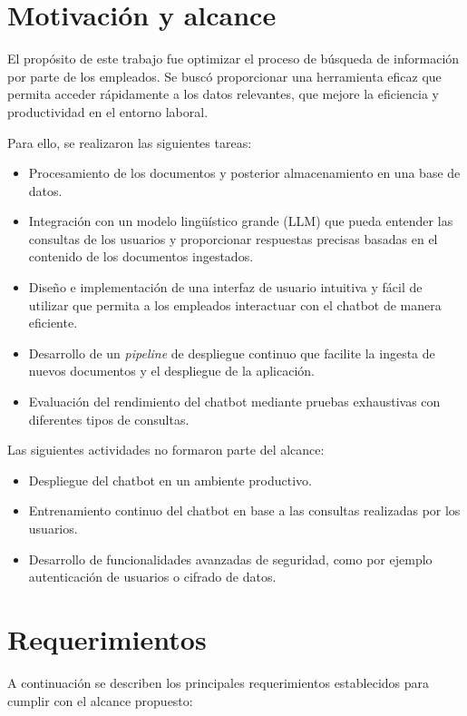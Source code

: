 \section{Motivación y alcance}

El propósito de este trabajo fue optimizar el proceso de búsqueda de información por parte de los empleados. Se buscó
proporcionar una herramienta eficaz que permita acceder rápidamente a los datos relevantes, que mejore la eficiencia y 
productividad en el entorno laboral.

Para ello, se realizaron las siguientes tareas:

\begin{itemize}
	\item Procesamiento de los documentos y posterior almacenamiento en una base de datos.
	\item Integración con un modelo lingüístico grande (LLM) que pueda entender las consultas de los usuarios y proporcionar respuestas precisas basadas en el contenido de los documentos ingestados.
	\item Diseño e implementación de una interfaz de usuario intuitiva y fácil de utilizar que permita a los empleados interactuar con el chatbot de manera eficiente.
	\item Desarrollo de un \textit{pipeline} de despliegue continuo que facilite la ingesta de nuevos documentos y el despliegue de la aplicación.
  \item Evaluación del rendimiento del chatbot mediante pruebas exhaustivas con diferentes tipos de consultas.
\end{itemize}

Las siguientes actividades no formaron parte del alcance:

\begin{itemize}
	\item Despliegue del chatbot en un ambiente productivo.
	\item Entrenamiento continuo del chatbot en base a las consultas realizadas por los usuarios.
	\item Desarrollo de funcionalidades avanzadas de seguridad, como por ejemplo autenticación de usuarios o cifrado de datos.
\end{itemize}

\section{Requerimientos}

A continuación se describen los principales requerimientos establecidos para cumplir
con el alcance propuesto: